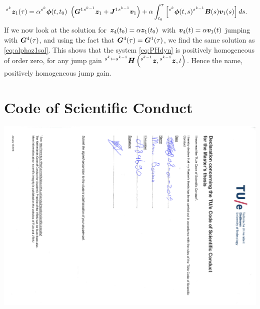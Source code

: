 \documentclass[../DC2019003Bouma.tex]{subfiles}
\begin{document}
\begin{align}
\ls^{s^{k}}\zb_1(\tau) &= \alpha \ls^{s^{k}}\phib(t,t_0)\ \left(\Gb^1 \ls^{s^{k-1}}\zb_1 + \Jb^1\ls^{s^{k-1}}\vb_1\right) + \alpha\int_{t_0}^\tau \left[\ls^{s^{k}}\phib(t,s)\ls^{s^{k-1}}\Bb(s)\vb_1(s)\right]ds.\label{eq:alphaz1sol}
\end{align}
If we now look at the solution for ${\boldsymbol{z}}_4(t_0) = \alpha{\boldsymbol{z}}_1(t_0)$ with ${\boldsymbol{v}}_4(t) = \alpha{\boldsymbol{v}}_1(t)$ jumping with ${\boldsymbol{G}}^4(\tau)$, and using the fact that ${\boldsymbol{G}}^4(\tau) = {\boldsymbol{G}}^1(\tau)$, we find the same solution as \eqref{eq:alphaz1sol}. This shows that the system \eqref{eq:PHdyn} is positively homogeneous of order zero, for any jump gain $^{s^{k}\leftarrow s^{k-1}}{\boldsymbol{H}}\left(\hspace{0cm}^{s^{k-1}}{\boldsymbol{z}},\hspace{0cm}^{s^{k-1}}{\boldsymbol{z}},t\right)$. Hence the name, positively homogeneous jump gain.

\pagestyle{fancyreport}
\chapter{Code of Scientific Conduct}\label{app:conduct}
\begin{center}
\includegraphics[trim={0 0 5cm 0},clip,angle=90,width=.9\textwidth]{codeofconduct.pdf}
\end{center}

\end{document}
